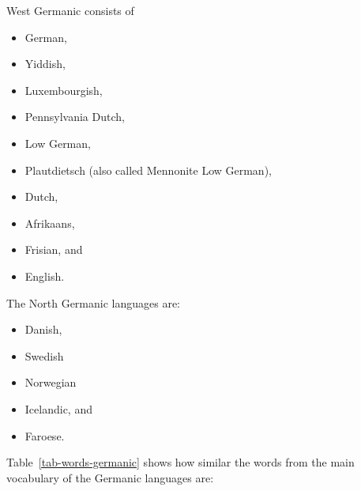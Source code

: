 West Germanic consists of 
\begin{itemize}
\item German, 
\item Yiddish, 
\item Luxembourgish, 
\item Pennsylvania Dutch, 
\item Low German, %
\item Plautdietsch (also called Mennonite Low German), %
\item Dutch, 
\item Afrikaans, 
\item Frisian, and 
\item English.
\end{itemize}
The North Germanic languages are:
\begin{itemize}
\item Danish,
\item Swedish
\item Norwegian
\item Icelandic, and 
\item Faroese.
\end{itemize}


Table~\vref{tab-words-germanic} shows how similar the words from the main vocabulary of the Germanic
languages are:
\begin{table}
\caption{\label{tab-words-germanic}Words from the main vocabulary of some Germanic languages}
\end{table}

